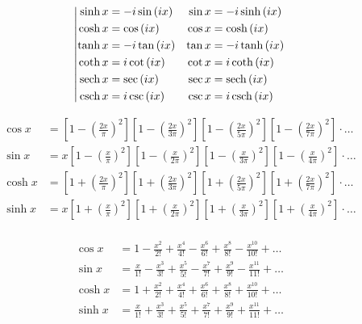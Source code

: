 \begin{equation*}
\left|
\begin{aligned}
\sinh{x} &= - i \sin{(i x)} & \sin{x} &= - i \sinh{(i x)}  \\
\cosh{x} &= \cos{(i x)} & \cos{x} &= \cosh{(i x)} \\
\tanh{x} &= - i \tan{(i x)} & \tan{x} &= - i \tanh{(i x)} \\
\coth{x} &= i \cot{(i x)} & \cot{x} &= i \coth{(i x)} \\
\operatorname{sech}{x} &= \sec{(i x)} & \sec{x} &= \operatorname{sech}{(i x)} \\
\operatorname{csch}{x} &= i \csc{(i x)} & \csc{x} &= i \operatorname{csch}{(i x)} \\
\end{aligned}
\right.
\end{equation*}

\begin{equation*}
\begin{aligned}
\cos{x} &= 
\left[1 - \left(\frac{2 x}{\pi} \right)^2 \right] 
\left[1 - \left(\frac{2 x}{3 \pi} \right)^2 \right]
\left[1 - \left(\frac{2 x}{5 \pi} \right)^2 \right] 
\left[1 - \left(\frac{2 x}{7 \pi} \right)^2 \right] 
\cdot \ldots \\
%
\sin{x} &= x 
\left[1 - \left(\frac{x}{\pi} \right)^2 \right] 
\left[1 - \left(\frac{x}{2 \pi} \right)^2 \right]
\left[1 - \left(\frac{x}{3 \pi} \right)^2 \right] 
\left[1 - \left(\frac{x}{4 \pi} \right)^2 \right] 
\cdot \ldots \\
%
\cosh{x} &= 
\left[1 + \left(\frac{2 x}{\pi} \right)^2 \right] 
\left[1 + \left(\frac{2 x}{3 \pi} \right)^2 \right]
\left[1 + \left(\frac{2 x}{5 \pi} \right)^2 \right] 
\left[1 + \left(\frac{2 x}{7 \pi} \right)^2 \right] 
\cdot \ldots \\
%
\sinh{x} &= x 
\left[1 + \left(\frac{x}{\pi} \right)^2 \right] 
\left[1 + \left(\frac{x}{2 \pi} \right)^2 \right]
\left[1 + \left(\frac{x}{3 \pi} \right)^2 \right] 
\left[1 + \left(\frac{x}{4 \pi} \right)^2 \right] 
\cdot \ldots \\
\end{aligned}
\end{equation*}

\begin{equation*}
\begin{aligned}
\cos{x} 
&= 1 
- \frac{x^2}{2!} 
+ \frac{x^4}{4!} 
- \frac{x^6}{6!} 
+ \frac{x^8}{8!} 
- \frac{x^{10}}{10!} 
+ \ldots \\
\sin{x} 
&= \frac{x}{1!} 
- \frac{x^3}{3!} 
+ \frac{x^5}{5!} 
- \frac{x^7}{7!} 
+ \frac{x^9}{9!} 
- \frac{x^{11}}{11!} 
+ \ldots \\
\cosh{x} 
&= 1 
+ \frac{x^2}{2!} 
+ \frac{x^4}{4!} 
+ \frac{x^6}{6!} 
+ \frac{x^8}{8!} 
+ \frac{x^{10}}{10!} 
+ \ldots \\
\sinh{x} 
&= \frac{x}{1!} 
+ \frac{x^3}{3!} 
+ \frac{x^5}{5!} 
+ \frac{x^7}{7!} 
+ \frac{x^9}{9!} 
+ \frac{x^{11}}{11!} 
+ \ldots \\
\end{aligned}
\end{equation*}

